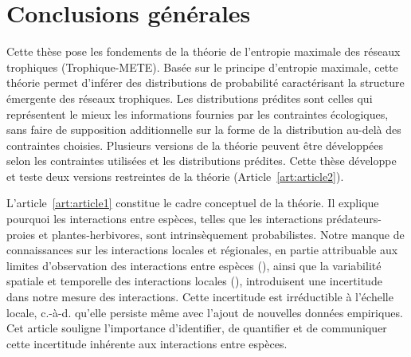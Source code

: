 
\francais   

\chapter{Conclusions générales}

Cette thèse pose les fondements de la théorie de l'entropie maximale des réseaux
trophiques (Trophique-METE). Basée sur le principe d'entropie maximale, cette
théorie permet d'inférer des distributions de probabilité caractérisant la
structure émergente des réseaux trophiques. Les distributions prédites sont
celles qui représentent le mieux les informations fournies par les contraintes
écologiques, sans faire de supposition additionnelle sur la forme de la
distribution au-delà des contraintes choisies. Plusieurs versions de la théorie
peuvent être développées selon les contraintes utilisées et les distributions
prédites. Cette thèse développe et teste deux versions restreintes de la théorie
(Article~\ref{art:article2}). 

L'article~\ref{art:article1} constitue le cadre conceptuel de la théorie. Il
explique pourquoi les interactions entre espèces, telles que les interactions
prédateurs-proies et plantes-herbivores, sont intrinsèquement probabilistes.
Notre manque de connaissances sur les interactions locales et régionales, en
partie attribuable aux limites d'observation des interactions entre espèces
(\cite{Jordano2016Sampling}), ainsi que la variabilité spatiale et temporelle
des interactions locales (\cite{Poisot2015Species}), introduisent une
incertitude dans notre mesure des interactions. Cette incertitude est
irréductible à l'échelle locale, c.-à-d. qu'elle persiste même avec l'ajout de
nouvelles données empiriques. Cet article souligne l'importance d'identifier, de
quantifier et de communiquer cette incertitude inhérente aux interactions entre
espèces. 


